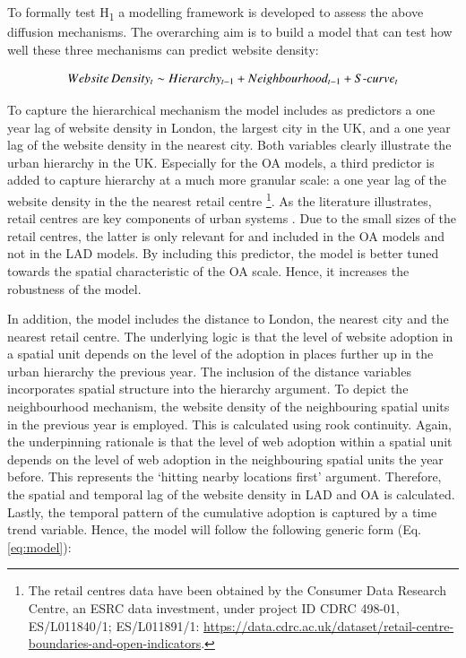 \documentclass[
  authoryear,
  preprint,
  3p]{elsarticle}
\begin{document}
To formally test H\textsubscript{1} a modelling framework is developed
to assess the above diffusion mechanisms. The overarching aim is to
build a model that can test how well these three mechanisms can predict
website density:

\begin{align}
Website\,Density_{t} \sim Hierarchy_{t-1} + Neighbourhood_{t-1} + S\text-curve_{t}\label{eq:rf.generic}
\end{align}

To capture the hierarchical mechanism the model includes as predictors a
one year lag of website density in London, the largest city in the UK,
and a one year lag of the website density in the nearest city. Both
variables clearly illustrate the urban hierarchy in the UK. Especially
for the OA models, a third predictor is added to capture hierarchy at a
much more granular scale: a one year lag of the website density in the
the nearest retail centre \footnote{The retail centres data have been
  obtained by the Consumer Data Research Centre, an ESRC data
  investment, under project ID CDRC 498-01, ES/L011840/1; ES/L011891/1:
  \url{https://data.cdrc.ac.uk/dataset/retail-centre-boundaries-and-open-indicators}.}.
As the literature illustrates, retail centres are key components of
urban systems \citep{dennis2002central, jones2021reframing}. Due to the
small sizes of the retail centres, the latter is only relevant for and
included in the OA models and not in the LAD models. By including this
predictor, the model is better tuned towards the spatial characteristic
of the OA scale. Hence, it increases the robustness of the model.

In addition, the model includes the distance to London, the nearest city
and the nearest retail centre. The underlying logic is that the level of
website adoption in a spatial unit depends on the level of the adoption
in places further up in the urban hierarchy the previous year. The
inclusion of the distance variables incorporates spatial structure into
the hierarchy argument. To depict the neighbourhood mechanism, the
website density of the neighbouring spatial units in the previous year
is employed. This is calculated using rook continuity. Again, the
underpinning rationale is that the level of web adoption within a
spatial unit depends on the level of web adoption in the neighbouring
spatial units the year before. This represents the `hitting nearby
locations first' argument. Therefore, the spatial and temporal lag of
the website density in LAD and OA is calculated. Lastly, the temporal
pattern of the cumulative adoption is captured by a time trend variable.
Hence, the model will follow the following generic form (Eq.
\ref{eq:model}):
\end{document}
